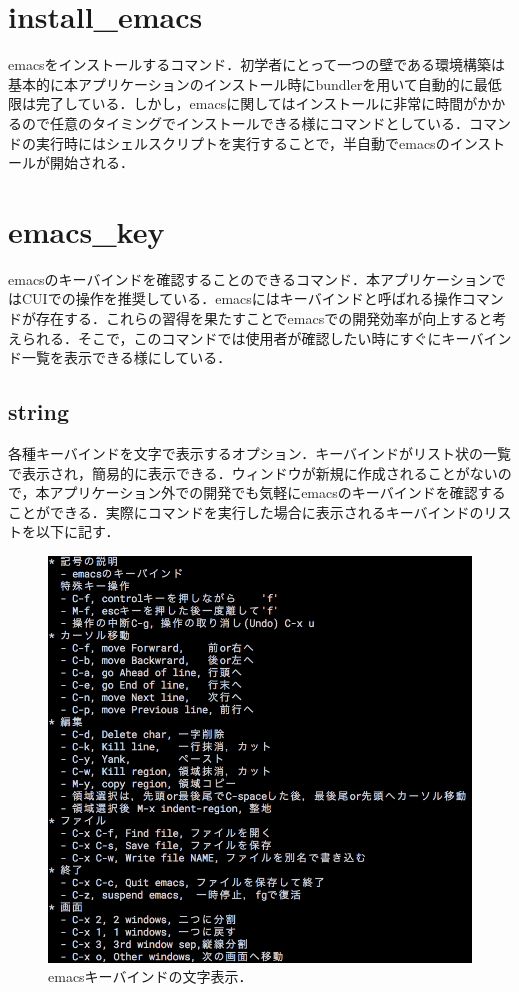 \section{install\_emacs}\label{install_emacs}
emacsをインストールするコマンド．初学者にとって一つの壁である環境構築は基本的に本アプリケーションのインストール時にbundlerを用いて自動的に最低限は完了している．しかし，emacsに関してはインストールに非常に時間がかかるので任意のタイミングでインストールできる様にコマンドとしている．コマンドの実行時にはシェルスクリプトを実行することで，半自動でemacsのインストールが開始される．

\section{emacs\_key}\label{emacs_key}
emacsのキーバインドを確認することのできるコマンド．本アプリケーションではCUIでの操作を推奨している．emacsにはキーバインドと呼ばれる操作コマンドが存在する．これらの習得を果たすことでemacsでの開発効率が向上すると考えられる．そこで，このコマンドでは使用者が確認したい時にすぐにキーバインド一覧を表示できる様にしている．

\subsection{string}\label{string}
各種キーバインドを文字で表示するオプション．キーバインドがリスト状の一覧で表示され，簡易的に表示できる．ウィンドウが新規に作成されることがないので，本アプリケーション外での開発でも気軽にemacsのキーバインドを確認することができる．実際にコマンドを実行した場合に表示されるキーバインドのリストを以下に記す．
\begin{figure}[H]
\centering
\begin{center}
\includegraphics[width=150mm]{../../picture/keybind_string.png}
\end{center}
\caption{emacsキーバインドの文字表示．\label{keybind_string}}
\end{figure}

